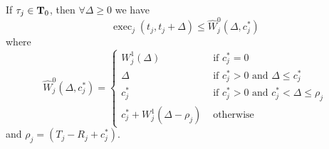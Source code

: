 \begin{Lemma}
\label{lemma:Wj0-exact}
If $\tau_j \in {\bf T}_0$, then $\forall \Delta \geq 0$ we have 
\[
\operatorname{exec}_j(t_j, t_j+\Delta) \leq \widehat{W}_j^0(\Delta, c_j^*) 
\]
where 
{\footnotesize \begin{equation}
    \label{eq:execution-case2-precise}
    \widehat{W}_j^0(\Delta, c_j^*)=
    \begin{cases}
      W_j^1(\Delta) & \mbox{ if } c_j^* = 0\\
      \Delta & \mbox{ if } c_j^* > 0 \mbox{ and } \Delta \leq  c_j^*\\
      c_j^* & \mbox{ if } c_j^* > 0 \mbox{ and } c_j^* < \Delta \leq  \rho_j\\
      c_j^* + W_j^1(\Delta-\rho_j) & \mbox{ otherwise}
    \end{cases}
  \end{equation}}
  and
  $\rho_j = (T_j-R_j +  c_j^*)$.
\end{Lemma}
